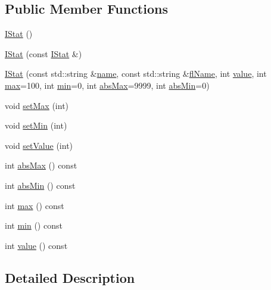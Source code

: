 \subsection*{Public Member Functions}
\begin{DoxyCompactItemize}
\item 
\hyperlink{class_flow_1_1_i_stat_ae9fdfde363f2c72f49cc12e6675b143d}{I\+Stat} ()
\item 
\hyperlink{class_flow_1_1_i_stat_ad1dbf438931a51b7f9c3435f63a782fd}{I\+Stat} (const \hyperlink{class_flow_1_1_i_stat}{I\+Stat} \&)
\item 
\hyperlink{class_flow_1_1_i_stat_a1511765ad0b6de79922c5edeff297960}{I\+Stat} (const std\+::string \&\hyperlink{class_flow_1_1_stat_a3b09172b24c2ea0b6a040861b13ac16a}{name}, const std\+::string \&\hyperlink{class_flow_1_1_stat_a82e355b6052a2bc3433dc1f8e48204fc}{fl\+Name}, int \hyperlink{class_flow_1_1_i_stat_aba43e05c007843c7085a6966842e305c}{value}, int \hyperlink{class_flow_1_1_i_stat_abe1547a7dd83b47c0f60ad7aedaa1116}{max}=100, int \hyperlink{class_flow_1_1_i_stat_aae6da9e74e17f356697e518ba3974f70}{min}=0, int \hyperlink{class_flow_1_1_i_stat_a4dcf3ab54ecddbdae7ccdfb86178109f}{abs\+Max}=9999, int \hyperlink{class_flow_1_1_i_stat_a19c20be8f2389371480f2cd07066d387}{abs\+Min}=0)
\item 
void \hyperlink{class_flow_1_1_i_stat_aca87e5a3e7de304739f9a32d5176b0ee}{set\+Max} (int)
\item 
void \hyperlink{class_flow_1_1_i_stat_a63acbda4a0cf88f55401e11fd79b4500}{set\+Min} (int)
\item 
void \hyperlink{class_flow_1_1_i_stat_a96644e89411ca827923e153693a2b9be}{set\+Value} (int)
\item 
int \hyperlink{class_flow_1_1_i_stat_a4dcf3ab54ecddbdae7ccdfb86178109f}{abs\+Max} () const
\item 
int \hyperlink{class_flow_1_1_i_stat_a19c20be8f2389371480f2cd07066d387}{abs\+Min} () const
\item 
int \hyperlink{class_flow_1_1_i_stat_abe1547a7dd83b47c0f60ad7aedaa1116}{max} () const
\item 
int \hyperlink{class_flow_1_1_i_stat_aae6da9e74e17f356697e518ba3974f70}{min} () const
\item 
int \hyperlink{class_flow_1_1_i_stat_aba43e05c007843c7085a6966842e305c}{value} () const
\end{DoxyCompactItemize}


\subsection{Detailed Description}


